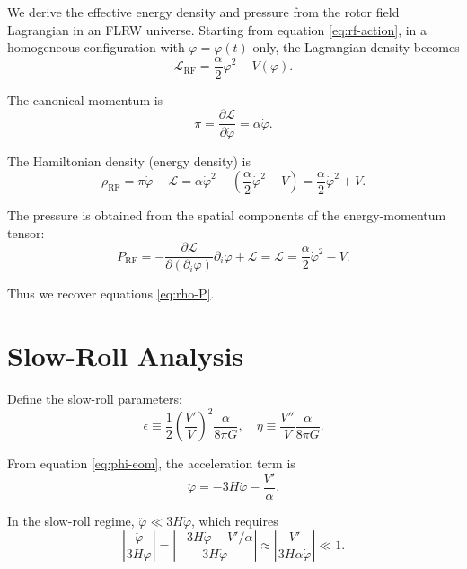 \documentclass[11pt,a4paper]{article}
\numberwithin{equation}{section}
\theoremstyle{plain}
\theoremstyle{definition}
\theoremstyle{remark}
\begin{document}
We derive the effective energy density and pressure from the rotor field Lagrangian in an FLRW universe. Starting from equation \eqref{eq:rf-action}, in a homogeneous configuration with $\varphi = \varphi(t)$ only, the Lagrangian density becomes
\begin{equation}
\mathcal{L}_{\mathrm{RF}} = \frac{\alpha}{2}\dot{\varphi}^2 - V(\varphi).
\end{equation}

The canonical momentum is
\begin{equation}
\pi = \frac{\partial \mathcal{L}}{\partial \dot{\varphi}} = \alpha\dot{\varphi}.
\end{equation}

The Hamiltonian density (energy density) is
\begin{equation}
\rho_{\mathrm{RF}} = \pi\dot{\varphi} - \mathcal{L} = \alpha\dot{\varphi}^2 - \left(\frac{\alpha}{2}\dot{\varphi}^2 - V\right) = \frac{\alpha}{2}\dot{\varphi}^2 + V.
\end{equation}

The pressure is obtained from the spatial components of the energy-momentum tensor:
\begin{equation}
P_{\mathrm{RF}} = -\frac{\partial \mathcal{L}}{\partial(\partial_i \varphi)}\partial_i\varphi + \mathcal{L} = \mathcal{L} = \frac{\alpha}{2}\dot{\varphi}^2 - V.
\end{equation}

Thus we recover equations \eqref{eq:rho-P}.

\section{Slow-Roll Analysis}
\label{app:slow-roll}

Define the slow-roll parameters:
\begin{equation}
\epsilon \equiv \frac{1}{2}\left(\frac{V'}{V}\right)^2\frac{\alpha}{8\pi G},
\quad
\eta \equiv \frac{V''}{V}\frac{\alpha}{8\pi G}.
\end{equation}

From equation \eqref{eq:phi-eom}, the acceleration term is
\begin{equation}
\ddot{\varphi} = -3H\dot{\varphi} - \frac{V'}{\alpha}.
\end{equation}

In the slow-roll regime, $\ddot{\varphi} \ll 3H\dot{\varphi}$, which requires
\begin{equation}
\left|\frac{\ddot{\varphi}}{3H\dot{\varphi}}\right| = \left|\frac{-3H\dot{\varphi} - V'/\alpha}{3H\dot{\varphi}}\right| \approx \left|\frac{V'}{3H\alpha\dot{\varphi}}\right| \ll 1.
\end{equation}
\end{document}
